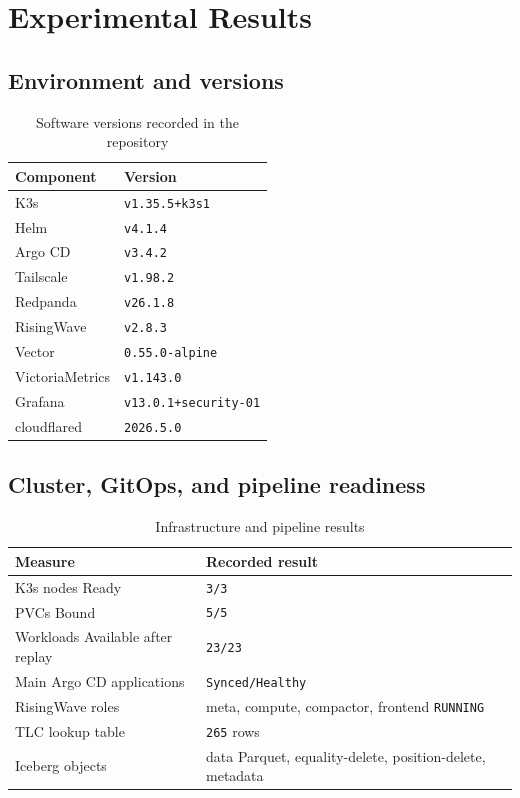 \section{Experimental Results}\label{sec:results}

\subsection{Environment and versions}
\begin{table}[H]
\centering
\caption{Software versions recorded in the repository}
\label{tab:versions-en}
\begin{tabular}{@{}ll@{}}
\toprule
\textbf{Component} & \textbf{Version}\\
\midrule
K3s & \texttt{v1.35.5+k3s1}\\
Helm & \texttt{v4.1.4}\\
Argo CD & \texttt{v3.4.2}\\
Tailscale & \texttt{v1.98.2}\\
Redpanda & \texttt{v26.1.8}\\
RisingWave & \texttt{v2.8.3}\\
Vector & \texttt{0.55.0-alpine}\\
VictoriaMetrics & \texttt{v1.143.0}\\
Grafana & \texttt{v13.0.1+security-01}\\
cloudflared & \texttt{2026.5.0}\\
\bottomrule
\end{tabular}
\end{table}

\subsection{Cluster, GitOps, and pipeline readiness}
\begin{table}[H]
\centering
\caption{Infrastructure and pipeline results}
\label{tab:infra-results-en}
\begin{tabularx}{0.92\textwidth}{@{}p{}Y@{}}
\toprule
\textbf{Measure} & \textbf{Recorded result}\\
\midrule
K3s nodes Ready & \texttt{3/3}\\
PVCs Bound & \texttt{5/5}\\
Workloads Available after replay & \texttt{23/23}\\
Main Argo CD applications & \texttt{Synced/Healthy}\\
RisingWave roles & meta, compute, compactor, frontend \texttt{RUNNING}\\
TLC lookup table & \texttt{265} rows\\
Iceberg objects & data Parquet, equality-delete, position-delete, metadata\\
\bottomrule
\end{tabularx}
\end{table}

